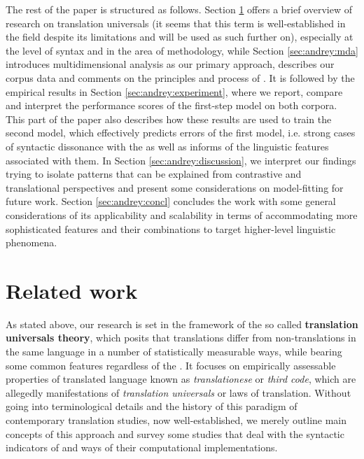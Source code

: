 \documentclass[output=paper]{langsci/langscibook.cls}
\begin{document}
The rest of the paper is structured as follows. Section \ref{sec:andrey:related} offers a brief overview of research on translation universals (it seems that this term is well-established in the field despite its limitations and will be used as such further on), especially at the level of syntax and in the area of methodology, while Section \ref{sec:andrey:mda} introduces multidimensional analysis as our primary approach, describes our corpus data and comments on the principles and process of . It is followed by the empirical results in Section \ref{sec:andrey:experiment}, where we report, compare and interpret the performance scores of the first-step model on both corpora. This part of the paper also describes how these results are used to train the second model, which effectively predicts errors of the first model, i.e. strong cases of syntactic dissonance with the  as well as informs of the linguistic features associated with them. In Section \ref{sec:andrey:discussion}, we interpret our findings trying to isolate patterns that can be explained from contrastive and translational perspectives and present some considerations on model-fitting for future work. Section \ref{sec:andrey:concl} concludes the work with some general considerations of its applicability and scalability in terms of accommodating more sophisticated features and their combinations to target higher-level linguistic phenomena.

\section{Related work}\label{sec:andrey:related}

As stated above, our research is set in the framework of the so called \textbf{translation universals theory}, which posits that translations differ from non-translations in the same language in a number of statistically measurable ways, while bearing some common features regardless of the . It focuses on empirically assessable properties of translated language known as \textit{translationese} or \textit{third code}, which are allegedly manifestations of \textit{translation universals} or laws of translation. Without going into terminological details and the history of this paradigm of contemporary translation studies, now well-established, we merely outline main concepts of this approach and survey some studies that deal with the syntactic indicators of  and ways of their computational implementations. 
\end{document}
